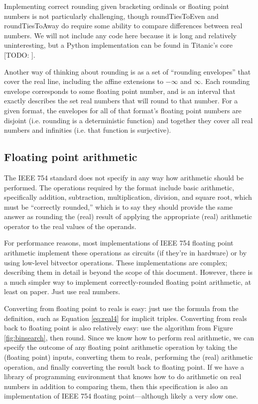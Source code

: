 \documentclass[letterpaper,10pt]{article}
\begin{document}
Implementing correct rounding given bracketing ordinals or floating point numbers is not particularly challenging, though roundTiesToEven and roundTiesToAway do require some ability to compare differences between real numbers. We will not include any code here because it is long and relatively uninteresting, but a Python implementation can be found in Titanic's core [TODO: \cite{undefined}].

Another way of thinking about rounding is as a set of ``rounding envelopes'' that cover the real line, including the affine extensions to $-\infty$ and $\infty$. Each rounding envelope corresponds to some floating point number, and is an interval that exactly describes the set real numbers that will round to that number. For a given format, the envelopes for all of that format's floating point numbers are disjoint (i.e. rounding is a deterministic function) and together they cover all real numbers and infinities (i.e. that function is surjective).

\subsection{Floating point arithmetic}

The IEEE 754 standard does not specify in any way how arithmetic should be performed. The operations required by the format include basic arithmetic, specifically addition, subtraction, multiplication, division, and square root, which must be ``correctly rounded,'' which is to say they should provide the same answer as rounding the (real) result of applying the appropriate (real) arithmetic operator to the real values of the operands.

For performance reasons, most implementations of IEEE 754 floating point arithmetic implement these operations as circuits (if they're in hardware) or by using low-level bitvector operations. These implementations are complex; describing them in detail is beyond the scope of this document. However, there is a much simpler way to implement correctly-rounded floating point arithmetic, at least on paper. Just use real numbers.

Converting from floating point to reals is easy: just use the formula from the definition, such as Equation \ref{eq:real4} for implicit triples. Converting from reals back to floating point is also relatively easy: use the algorithm from Figure \ref{fig:binsearch}, then round. Since we know how to perform real arithmetic, we can specify the outcome of any floating point arithmetic operation by taking the (floating point) inputs, converting them to reals, performing the (real) arithmetic operation, and finally converting the result back to floating point. If we have a library of programming environment that knows how to do arithmetic on real numbers in addition to comparing them, then this specification is also an implementation of IEEE 754 floating point---although likely a very slow one.
\end{document}
